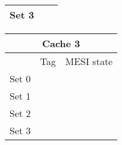 \begin{center}
\begin{tabular}{|ccc|}
\multicolumn{1}{|c|}{Set 3} & \multicolumn{1}{c|}{} &            \\ \hline
\end{tabular}
\begin{tabular}{|ccc|}
\hline
\multicolumn{3}{|c|}{\textbf{Cache 3}}                                   \\ \hline
\multicolumn{1}{|c|}{}      & \multicolumn{1}{c|}{Tag}      & MESI state \\ \hline
\multicolumn{1}{|c|}{Set 0} & \multicolumn{1}{c|}{} &            \\ \hline
\multicolumn{1}{|c|}{Set 1} & \multicolumn{1}{c|}{} &            \\ \hline
\multicolumn{1}{|c|}{Set 2} & \multicolumn{1}{c|}{} &            \\ \hline
\multicolumn{1}{|c|}{Set 3} & \multicolumn{1}{c|}{} &            \\ \hline
\end{tabular}
\end{center}